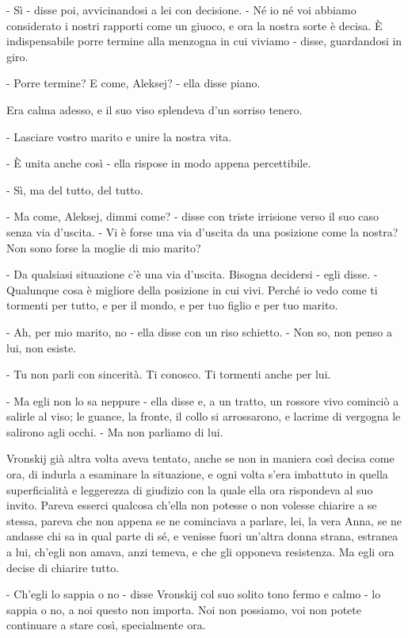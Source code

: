 - Sì - disse poi, avvicinandosi a lei con decisione. - Né io né voi abbiamo considerato i nostri rapporti come un giuoco, e ora la nostra sorte è decisa. È indispensabile porre termine alla menzogna in cui viviamo - disse, guardandosi in giro. 

- Porre termine? E come, Aleksej? - ella disse piano. 

Era calma adesso, e il suo viso splendeva d'un sorriso tenero. 

- Lasciare vostro marito e unire la nostra vita. 

- È unita anche così - ella rispose in modo appena percettibile. 

- Sì, ma del tutto, del tutto. 

- Ma come, Aleksej, dimmi come? - disse con triste irrisione verso il suo caso senza via d'uscita. - Vi è forse una via d'uscita da una posizione come la nostra? Non sono forse la moglie di mio marito? 

- Da qualsiasi situazione c'è una via d'uscita. Bisogna decidersi - egli disse. - Qualunque cosa è migliore della posizione in cui vivi. Perché io vedo come ti tormenti per tutto, e per il mondo, e per tuo figlio e per tuo marito. 

- Ah, per mio marito, no - ella disse con un riso schietto. - Non so, non penso a lui, non esiste. 

- Tu non parli con sincerità. Ti conosco. Ti tormenti anche per lui. 

- Ma egli non lo sa neppure - ella disse e, a un tratto, un rossore vivo cominciò a salirle al viso; le guance, la fronte, il collo si arrossarono, e lacrime di vergogna le salirono agli occhi. - Ma non parliamo di lui. 

Vronskij già altra volta aveva tentato, anche se non in maniera così decisa come ora, di indurla a esaminare la situazione, e ogni volta s'era imbattuto in quella superficialità e leggerezza di giudizio con la quale ella ora rispondeva al suo invito. Pareva esserci qualcosa ch'ella non potesse o non volesse chiarire a se stessa, pareva che non appena se ne cominciava a parlare, lei, la vera Anna, se ne andasse chi sa in qual parte di sé, e venisse fuori un'altra donna strana, estranea a lui, ch'egli non amava, anzi temeva, e che gli opponeva resistenza. Ma egli ora decise di chiarire tutto. 

- Ch'egli lo sappia o no - disse Vronskij col suo solito tono fermo e calmo - lo sappia o no, a noi questo non importa. Noi non possiamo, voi non potete continuare a stare così, specialmente ora. 


